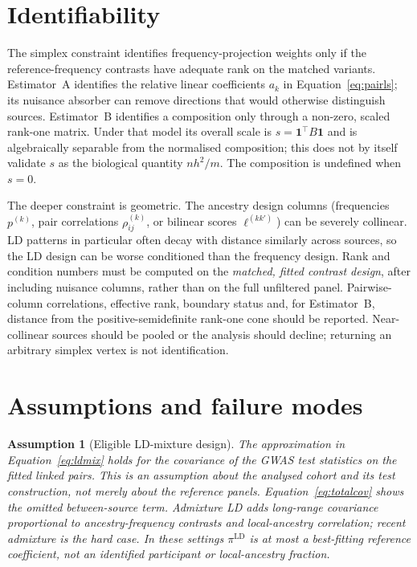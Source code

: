 \documentclass[11pt,a4paper]{article}
\newtheorem{assumption}{Assumption}
\newcommand{\Rho}{\rho}
\begin{document}
\section{Identifiability}\label{sec:identifiability}

The simplex constraint identifies frequency-projection weights only if the
reference-frequency contrasts have adequate rank on the matched variants.
Estimator~A identifies the relative linear coefficients $a_k$ in
Equation~\eqref{eq:pairls}; its nuisance absorber can remove directions that
would otherwise distinguish sources. Estimator~B identifies a composition
only through a non-zero, scaled rank-one matrix. Under that model its overall
scale is $s=\mathbf{1}^{\top}B\mathbf{1}$ and is algebraically separable from
the normalised composition; this does not by itself validate $s$ as the
biological quantity $nh^2/m$. The composition is undefined when $s=0$.

The deeper constraint is geometric. The ancestry design columns
(frequencies $p^{(k)}$, pair correlations $\Rho^{(k)}_{ij}$, or bilinear
scores $\ell^{(kk')}$) can be severely collinear. LD patterns in particular
often decay with distance similarly across sources, so the LD design can be
worse conditioned than the frequency design. Rank and condition numbers
must be computed on the \emph{matched, fitted contrast design}, after
including nuisance columns, rather than on the full unfiltered panel.
Pairwise-column correlations, effective rank, boundary status and, for
Estimator~B, distance from the positive-semidefinite rank-one cone should be
reported. Near-collinear sources should be pooled or the analysis should
decline; returning an arbitrary simplex vertex is not identification.

\section{Assumptions and failure modes}\label{sec:failure}

\begin{assumption}[Eligible LD-mixture design]\label{ass:mixture}
The approximation in Equation~\eqref{eq:ldmix} holds for the covariance of
the GWAS test statistics on the fitted linked pairs. This is an assumption
about the analysed cohort and its test construction, not merely about the
reference panels. Equation~\eqref{eq:totalcov} shows the omitted
between-source term. Admixture LD adds long-range covariance proportional to
ancestry-frequency contrasts and local-ancestry correlation; recent
admixture is the hard case. In these settings
$\pi^{\mathrm{LD}}$ is at most a best-fitting reference coefficient, not an
identified participant or local-ancestry fraction.
\end{assumption}
\end{document}
